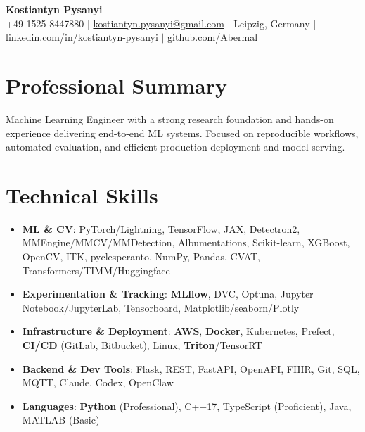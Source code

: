\documentclass[letterpaper,10pt]{article}
\newcommand{\resumeItem}[1]{
    \item\small{#1}\vspace{-0.5pt}
}
\newcommand{\resumeSubHeadingList}{\begin{itemize}[leftmargin=0.15in, label={}]\vspace{-2pt}}
\newcommand{\resumeSubHeadingListEnd}{\end{itemize}}
\begin{document}
\begin{center}
  \textbf{\Huge Kostiantyn Pysanyi}\vspace{4pt} \\
  \small +49 1525 8447880 $|$ \href{mailto:kostiantyn.pysanyi@gmail.com}{kostiantyn.pysanyi@gmail.com} $|$ Leipzig, Germany $|$
  \href{https://www.linkedin.com/in/kostiantyn-pysanyi/}{linkedin.com/in/kostiantyn-pysanyi} $|$ \href{https://github.com/Abermal}{github.com/Abermal}
\end{center}




\section{Professional Summary}
Machine Learning Engineer with a strong research foundation and hands-on experience delivering end-to-end ML systems. Focused on reproducible workflows, automated evaluation, and efficient production deployment and model serving.

\section{Technical Skills}
\resumeSubHeadingList
  \resumeItem{\textbf{ML \& CV}: PyTorch/Lightning, TensorFlow, JAX, Detectron2, MMEngine/MMCV/MMDetection, Albumentations, Scikit-learn, XGBoost, OpenCV, ITK, pyclesperanto, NumPy, Pandas, CVAT, Transformers/TIMM/Huggingface}
  \resumeItem{\textbf{Experimentation \& Tracking}: \textbf{MLflow}, DVC, Optuna, Jupyter Notebook/JupyterLab, Tensorboard, Matplotlib/seaborn/Plotly}
  \resumeItem{\textbf{Infrastructure \& Deployment}: \textbf{AWS}, \textbf{Docker}, Kubernetes, Prefect, \textbf{CI/CD} (GitLab, Bitbucket), Linux, \textbf{Triton}/TensorRT}
  \resumeItem{\textbf{Backend \& Dev Tools}: Flask, REST, FastAPI, OpenAPI, FHIR, Git, SQL, MQTT, Claude, Codex, OpenClaw}
  \resumeItem{\textbf{Languages}: \textbf{Python} (Professional), C++17, TypeScript (Proficient), Java, MATLAB (Basic)}
\resumeSubHeadingListEnd
\end{document}
